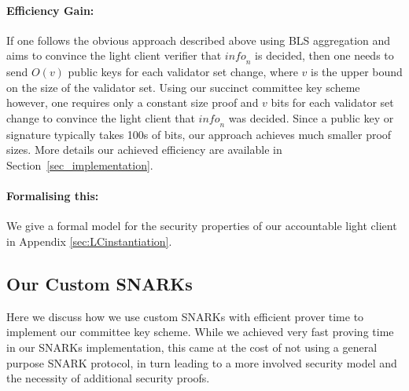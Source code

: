 \noindent\paragraph{Efficiency Gain:} If one follows the obvious approach described above using BLS aggregation and aims to convince the light client verifier that $\mathit{info}_n$ is decided, then one needs to send $O(v)$ public keys for each validator set change, where $v$ is the upper bound on the size of the validator set. Using our succinct committee key scheme however, one requires only a constant size proof and $v$ bits for each validator set change to convince the light client that $\mathit{info}_n$ was decided. Since a public key or signature typically takes 100s of bits, our approach achieves much smaller proof sizes.  More details our achieved efficiency are available in Section~\ref{sec_implementation}.
\vspace{-0.05in}

\noindent\paragraph{Formalising this:} We give a formal model for the security properties of our accountable light client in Appendix \ref{sec:LCinstantiation}.

\vspace{-0.1cm}
\subsection{Our Custom SNARKs}

\noindent Here we discuss how we use custom SNARKs with efficient prover time to implement our committee key scheme. While we achieved very fast proving time in our SNARKs implementation, this came at the cost of not using a general purpose SNARK protocol, in turn leading to a more involved security model and the necessity of additional security proofs.  \\

